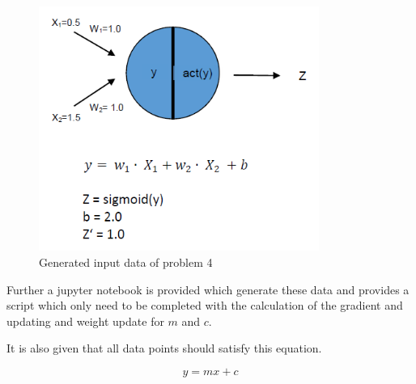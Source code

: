 \begin{figure}[h]
	\centering
	\includegraphics[height=8cm]{img/nn_task2.png}
	\caption{Generated input data of problem 4}
    \label{problem4_imput_data}
\end{figure}

Further a jupyter notebook is provided which generate these data and provides a script which only need to be completed with the calculation of the gradient and updating and weight update for $m$ and $c$.

It is also given that all data points should satisfy this equation.

\begin{equation}\label{gradients1}
    y = mx + c
\end{equation}


